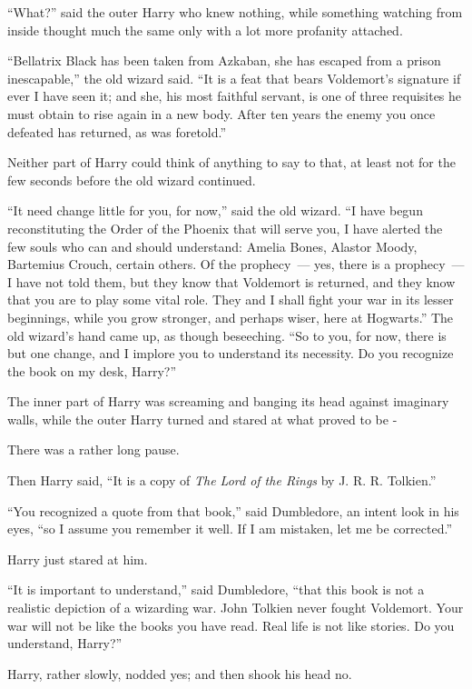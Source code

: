 ``What?'' said the outer Harry who knew nothing, while something watching from inside thought much the same only with a lot more profanity attached.

``Bellatrix Black has been taken from Azkaban, she has escaped from a prison inescapable,'' the old wizard said. ``It is a feat that bears Voldemort's signature if ever I have seen it; and she, his most faithful servant, is one of three requisites he must obtain to rise again in a new body. After ten years the enemy you once defeated has returned, as was foretold.''

Neither part of Harry could think of anything to say to that, at least not for the few seconds before the old wizard continued.

``It need change little for you, for now,'' said the old wizard. ``I have begun reconstituting the Order of the Phoenix that will serve you, I have alerted the few souls who can and should understand: Amelia Bones, Alastor Moody, Bartemius Crouch, certain others. Of the prophecy~--- yes, there is a prophecy~--- I have not told them, but they know that Voldemort is returned, and they know that you are to play some vital role. They and I shall fight your war in its lesser beginnings, while you grow stronger, and perhaps wiser, here at Hogwarts.'' The old wizard's hand came up, as though beseeching. ``So to you, for now, there is but one change, and I implore you to understand its necessity. Do you recognize the book on my desk, Harry?''

The inner part of Harry was screaming and banging its head against imaginary walls, while the outer Harry turned and stared at what proved to be -

There was a rather long pause.

Then Harry said, ``It is a copy of \emph{The Lord of the Rings} by J. R. R. Tolkien.''

``You recognized a quote from that book,'' said Dumbledore, an intent look in his eyes, ``so I assume you remember it well. If I am mistaken, let me be corrected.''

Harry just stared at him.

``It is important to understand,'' said Dumbledore, ``that this book is not a realistic depiction of a wizarding war. John Tolkien never fought Voldemort. Your war will not be like the books you have read. Real life is not like stories. Do you understand, Harry?''

Harry, rather slowly, nodded yes; and then shook his head no.

